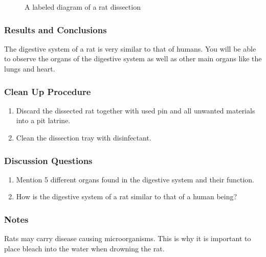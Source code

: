 \begin{figure}[h]
\begin{center}
\def\svgwidth{10cm}

\caption{A labeled diagram of a rat dissection}
\label{fig:rat-dissection}
\end{center}
\end{figure}

\subsubsection*{Results and Conclusions}
The digestive system of a rat is very similar to that of humans. You will be able to observe the organs of the digestive system as well as other main organs like the lungs and heart.

\subsubsection*{Clean Up Procedure}
\begin{enumerate}
\item{Discard the dissected rat together with used pin and all unwanted materials into a pit latrine.}
\item{Clean the dissection tray with disinfectant.}
\end{enumerate}

\subsubsection*{Discussion Questions}
\begin{enumerate}
\item{Mention 5 different organs found in the digestive system and their function.}
\item{How is the digestive system of a rat similar to that of a human being?}
\end{enumerate}

\subsubsection*{Notes}
Rats may carry disease causing microorganisms. This is why it is important to place bleach into the water when drowning the rat.
